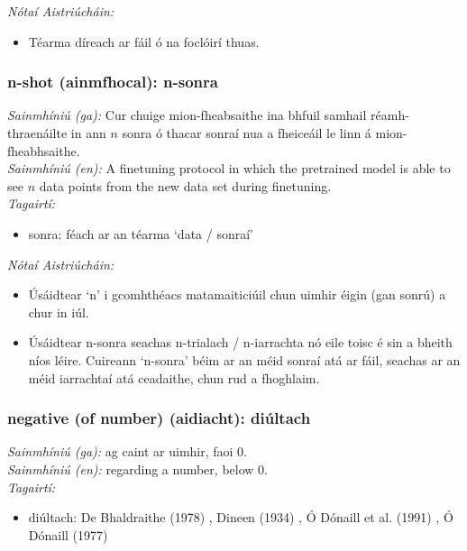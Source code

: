  \noindent \textit{Nótaí Aistriúcháin:}
\begin{itemize}
	\item Téarma díreach ar fáil ó na foclóirí thuas.
\end{itemize}


\subsubsection*{n-shot (ainmfhocal): n-sonra}
 \noindent \textit{Sainmhíniú (ga):} Cur chuige mion-fheabsaithe ina bhfuil samhail réamh-thraenáilte in ann $n$ sonra ó thacar sonraí nua a fheiceáil le linn á mion-fheabhsaithe.
\\
 \noindent \textit{Sainmhíniú (en):} A finetuning protocol in which the pretrained model is able to see $n$ data points from the new data set during finetuning.
\\
 \noindent \textit{Tagairtí:}
\begin{itemize}
	\item sonra: féach ar an téarma `data / sonraí'
\end{itemize}

 \noindent \textit{Nótaí Aistriúcháin:}
\begin{itemize}
	\item Úsáidtear `n' i gcomhthéacs matamaiticiúil chun uimhir éigin (gan sonrú) a chur in iúl.
	\item Úsáidtear n-sonra seachas n-trialach / n-iarrachta nó eile toisc é sin a bheith níos léire. Cuireann `n-sonra' béim ar an méid sonraí atá ar fáil, seachas ar an méid iarrachtaí atá ceadaithe, chun rud a fhoghlaim.
\end{itemize}


\subsubsection*{negative (of number) (aidiacht): diúltach}
 \noindent \textit{Sainmhíniú (ga):} ag caint ar uimhir, faoi 0.
\\
 \noindent \textit{Sainmhíniú (en):} regarding a number, below 0.
\\
 \noindent \textit{Tagairtí:}
\begin{itemize}
	\item diúltach: De Bhaldraithe (1978) \cite{de-bhaldraithe}, Dineen (1934) \cite{dineen}, Ó Dónaill et al. (1991) \cite{focloir-beag}, Ó Dónaill (1977) \cite{odonaill}
\end{itemize}

